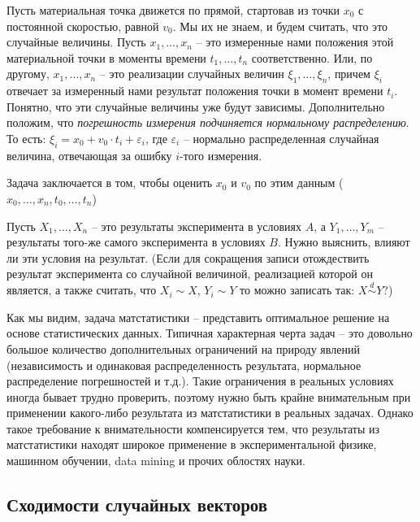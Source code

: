 \documentclass[document.tex]{subfiles}
\begin{document}
\begin{example}
	Пусть материальная точка движется по прямой, стартовав из точки $x_0$ с постоянной скоростью, равной $v_0$. Мы их не знаем, и будем считать, что это случайные величины. Пусть $x_1, \dots, x_n$ -- это измеренные нами положения этой материальной точки в моменты времени $t_1, \dots, t_n$ соответственно. Или, по другому, $x_1, \dots, x_n$ -- это реализации случайных величин $\xi_1, \dots, \xi_n$, причем $\xi_i$ отвечает за измеренный нами результат положения точки в момент времени $t_i$. Понятно, что эти случайные величины уже будут зависимы. Дополнительно положим, что \textit{погрешность измерения подчиняется нормальному распределению}. То есть: $\xi_i = x_0 + v_0 \cdot t_i + \varepsilon_i$, где $\varepsilon_i$ -- нормально распределенная случайная величина, отвечающая за ошибку $i$-того измерения.

	Задача заключается в том, чтобы оценить $x_0$ и $v_0$ по этим данным ($x_0, \dots, x_n, t_0, \dots, t_n$)
\end{example}

\begin{example}
	Пусть $X_1, \dots, X_n$ -- это результаты эксперимента в условиях $A$, а $Y_1, \dots, Y_m$ -- результаты того-же самого эксперимента в условиях $B$. Нужно выяснить, влияют ли эти условия на результат. (Если для сокращения записи отождествить результат эксперимента со случайной величиной, реализацией которой он является, а также считать, что $X_i \sim X$, $Y_i \sim Y$ то можно записать так: $X \stackrel{d}{\sim} Y$?)
\end{example}

\begin{remark}
	Как мы видим, задача матстатистики -- представить оптимальное решение на основе статистических данных. Типичная характерная черта задач -- это довольно большое количество дополнительных ограничений на природу явлений (независимость и одинаковая распределенность результата, нормальное распределение погрешностей и т.д.). Такие ограничения в реальных условиях иногда бывает трудно проверить, поэтому нужно быть крайне внимательным при применении какого-либо результата из матстатистики в реальных задачах. Однако такое требование к внимательности компенсируется тем, что результаты из матстатистики находят широкое применение в экспериментальной физике, машинном обучении, data mining и прочих облостях науки.
\end{remark}

\subsection{Сходимости случайных векторов}
\end{document}
